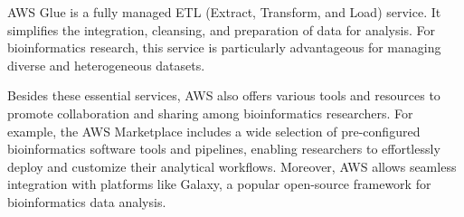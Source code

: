             AWS Glue is a fully managed ETL (Extract, Transform, and Load) service. It simplifies the integration, cleansing, and preparation of data for analysis. For bioinformatics research, this service is particularly advantageous for managing diverse and heterogeneous datasets.
            
            Besides these essential services, AWS also offers various tools and resources to promote collaboration and sharing among bioinformatics researchers. For example, the AWS Marketplace includes a wide selection of pre-configured bioinformatics software tools and pipelines, enabling researchers to effortlessly deploy and customize their analytical workflows. Moreover, AWS allows seamless integration with platforms like Galaxy, a popular open-source framework for bioinformatics data analysis.

